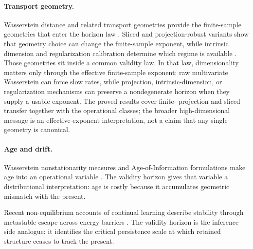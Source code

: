 \paragraph{Transport geometry.}
Wasserstein distance and related transport geometries provide the finite-sample
geometries that enter the horizon law \citep{FournierGuillin2015,
BoissardLeGouic2014,NilesWeedBach2019,GenevayEtAl2019,MenaWeed2019,
delBarrioEtAl2023,GoldfeldEtAl2022}. Sliced and projection-robust variants
show that geometry choice can change the finite-sample exponent, while intrinsic
dimension and regularization calibration determine which regime is available
\citep{KolouriRohdeHoffmann2018,DeshpandeEtAl2019,PatyCuturi2019,
LinEtAl2020,NadjahiEtAl2020,NietertEtAl2022,GenansWintenberger2026,FaccoEtAl2017}.
Those geometries sit inside a common validity law. In that law,
dimensionality matters only through the effective finite-sample exponent: raw
multivariate Wasserstein can force slow rates, while projection,
intrinsic-dimension, or regularization mechanisms can preserve a nondegenerate
horizon when they supply a usable exponent. The proved results cover finite-
projection and sliced transfer together with the operational classes;
the broader high-dimensional message is an effective-exponent interpretation,
not a claim that any single geometry is canonical.

\paragraph{Age and drift.}
Wasserstein nonstationarity measures and Age-of-Information formulations make
age into an operational variable \citep{JiangLiZhang2020,
KeehanAndersonWiesemann2025,AminiVinas2026,KaulYatesGruteser2012,
YatesEtAl2021AoI}. The validity horizon gives that variable a
distributional interpretation: age is costly because it accumulates geometric
mismatch with the present.

Recent non-equilibrium accounts of continual learning describe stability through
metastable escape across energy barriers \citep{Kim2026}. The validity horizon
is the inference-side analogue: it identifies the critical persistence
scale at which retained structure ceases to track the present.
